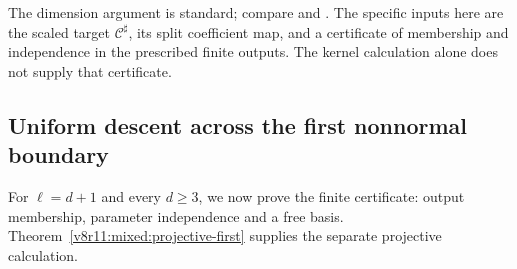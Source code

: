 \documentclass[10pt,fleqn]{article}
\numberwithin{equation}{section}
\begin{document}
The dimension argument is standard; compare
\cite[Lemmas~2.2--2.3 and the proof of Theorem~2.4]{EtingofRains}
and \cite[proof of Theorem~5.8]{SergeevVeselovMR}.
The specific inputs here are the scaled target $\mathscr C^\sharp$, its
split coefficient map, and a certificate of membership and independence
in the prescribed finite outputs.  The kernel calculation alone does
not supply that certificate.

\subsection{Uniform descent across the first nonnormal boundary}

For $\ell=d+1$ and every $d\ge3$, we now prove the finite certificate:
output membership, parameter independence and a free basis.
Theorem~\ref{v8r11:mixed:projective-first} supplies the separate
projective calculation.
\end{document}
